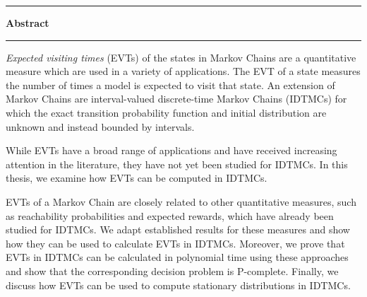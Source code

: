 %

\thispagestyle{empty}
\rule{\textwidth}{}
\begin{center}
\large
\textbf{Abstract}\\
\vspace{0mm} %
\end{center}
\rule{\textwidth}{}
\vspace{1mm}

\textit{Expected visiting times} (EVTs) of the states in Markov Chains are a quantitative measure which are used in a variety of applications. The EVT of a state measures the number of times a model is expected to visit that state. An extension of Markov Chains are interval-valued discrete-time Markov Chains (IDTMCs) for which the exact transition probability function and initial distribution are unknown and instead bounded by intervals.

While EVTs have a broad range of applications and have received increasing attention in the literature, they have not yet been studied for IDTMCs. In this thesis, we examine how EVTs can be computed in IDTMCs.

EVTs of a Markov Chain are closely related to other quantitative measures, such as reachability probabilities and expected rewards, which have already been studied for IDTMCs. We adapt established results for these measures and show how they can be used to calculate EVTs in IDTMCs. Moreover, we prove that EVTs in IDTMCs can be calculated in polynomial time using these approaches and show that the corresponding decision problem is P-complete. Finally, we discuss how EVTs can be used to compute stationary distributions in IDTMCs.